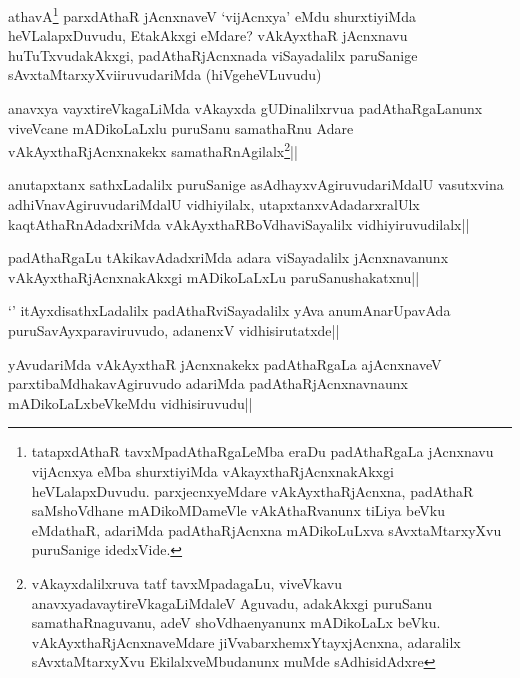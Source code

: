 
\begin{artha}
athavA\footnote{tatapxdAthaR tavxMpadAthaRgaLeMba eraDu padAthaRgaLa jAcnxnavu vijAcnxya eMba shurxtiyiMda vAkayxthaRjAcnxnakAkxgi heVLalapxDuvudu. parxjecnxyeMdare vAkAyxthaRjAcnxna, padAthaR saMshoVdhane mADikoMDameVle vAkAthaRvanunx tiLiya beVku eMdathaR, adariMda padAthaRjAcnxna mADikoLuLxva sAvxtaMtarxyXvu puruSanige idedxVide.} parxdAthaR jAcnxnaveV `vijAcnxya' eMdu shurxtiyiMda heVLalapxDuvudu, EtakAkxgi eMdare? vAkAyxthaR jAcnxnavu huTuTxvudakAkxgi, padAthaRjAcnxnada viSayadalilx paruSanige sAvxtaMtarxyXviiruvudariMda (hiVgeheVLuvudu)
\end{artha}


\begin{artha}
anavxya vayxtireVkagaLiMda vAkayxda gUDinalilxrvua padAthaRgaLanunx viveVcane mADikoLaLxlu puruSanu samathaRnu Adare vAkAyxthaRjAcnxnakekx samathaRnAgilalx\footnote{vAkayxdalilxruva tatf tavxMpadagaLu, viveVkavu anavxyadavaytireVkagaLiMdaleV Aguvadu, adakAkxgi puruSanu samathaRnaguvanu, adeV shoVdhaenyanunx mADikoLaLx beVku. vAkAyxthaRjAcnxnaveMdare jiVvabarxhemxYtayxjAcnxna, adaralilx sAvxtaMtarxyXvu EkilalxveMbudanunx muMde sAdhisidAdxre}||
\end{artha}

\begin{artha}
anutapxtanx sathxLadalilx puruSanige asAdhayxvAgiruvudariMdalU vasutxvina adhiVnavAgiruvudariMdalU vidhiyilalx, utapxtanxvAdadarxralUlx kaqtAthaRnAdadxriMda vAkAyxthaRBoVdhaviSayalilx vidhiyiruvudilalx||
\end{artha}

\begin{artha}
padAthaRgaLu tAkikavAdadxriMda adara viSayadalilx jAcnxnavanunx vAkAyxthaRjAcnxnakAkxgi mADikoLaLxLu paruSanushakatxnu||
\end{artha}

\begin{artha}
`\stext' itAyxdisathxLadalilx padAthaRviSayadalilx yAva anumAnarUpavAda puruSavAyxparaviruvudo, adanenxV vidhisirutatxde||
\end{artha}

\begin{artha}
yAvudariMda vAkAyxthaR jAcnxnakekx padAthaRgaLa ajAcnxnaveV parxtibaMdhakavAgiruvudo adariMda padAthaRjAcnxnavnaunx mADikoLaLxbeVkeMdu vidhisiruvudu||
\end{artha}

